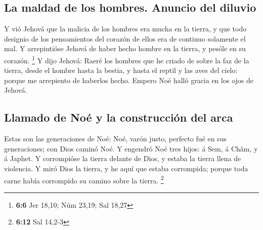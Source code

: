 \hypertarget{la-maldad-de-los-hombres.-anuncio-del-diluvio}{%
\subsection{La maldad de los hombres. Anuncio del
diluvio}\label{la-maldad-de-los-hombres.-anuncio-del-diluvio}}

 Y vió Jehová que la malicia de los hombres era mucha en
la tierra, y que todo designio de los pensamientos del corazón de ellos
era de continuo solamente el mal.  Y arrepintióse Jehová
de haber hecho hombre en la tierra, y pesóle en su corazón. \footnote{\textbf{6:6}
  Jer 18,10; Núm 23,19; Sal 18,27}  Y dijo Jehová: Raeré
los hombres que he criado de sobre la faz de la tierra, desde el hombre
hasta la bestia, y hasta el reptil y las aves del cielo: porque me
arrepiento de haberlos hecho.  Empero Noé halló gracia en
los ojos de Jehová.

\hypertarget{llamado-de-nouxe9-y-la-construcciuxf3n-del-arca}{%
\subsection{Llamado de Noé y la construcción del
arca}\label{llamado-de-nouxe9-y-la-construcciuxf3n-del-arca}}

 Estas son las generaciones de Noé: Noé, varón justo,
perfecto fué en sus generaciones; con Dios caminó Noé.  Y
engendró Noé tres hijos: á Sem, á Châm, y á Japhet.  Y
corrompióse la tierra delante de Dios, y estaba la tierra llena de
violencia.  Y miró Dios la tierra, y he aquí que estaba
corrompida; porque toda carne había corrompido su camino sobre la
tierra. \footnote{\textbf{6:12} Sal 14,2-3}

